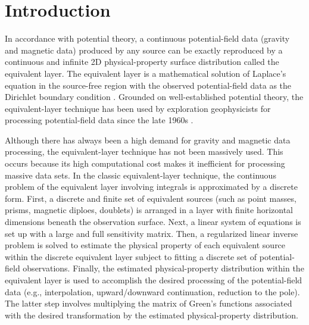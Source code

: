 \section{Introduction}
In accordance with potential theory, a continuous potential-field data (gravity and magnetic data) produced by any source can be exactly reproduced by a continuous and infinite 2D physical-property surface distribution  called the equivalent layer. The equivalent layer is a mathematical solution of Laplace’s equation in the source-free region with the observed potential-field data as the Dirichlet boundary condition \citep{kellogg1967}. Grounded on well-established potential theory, the equivalent-layer technique has been used by exploration geophysicists for processing potential-field data since the late 1960s \citep{dampney1969}. 

Although there has always been a high demand for gravity and magnetic data processing, the equivalent-layer technique has not been massively used. 
This occurs because its high computational cost makes it inefficient for processing massive data sets. 
In the classic equivalent-layer technique, the continuous problem of the equivalent layer involving integrals is approximated by a discrete form. 
First, a discrete and finite set of equivalent sources (such as point masses, prisms, magnetic diploes, doublets) is arranged in a layer with finite horizontal dimensions beneath the observation surface. 
Next, a linear system of equations is set up with a large and full sensitivity matrix. Then, a regularized linear inverse problem is solved to estimate the physical property of each equivalent source within the discrete equivalent layer subject to fitting a discrete set of potential-field observations. 
Finally, the estimated physical-property distribution within the equivalent layer is used to accomplish the desired processing of the potential-field data (e.g., interpolation, upward/downward continuation,  reduction to the pole). The latter step involves multiplying the matrix of Green’s functions associated with the desired transformation by the estimated physical-property distribution. 

